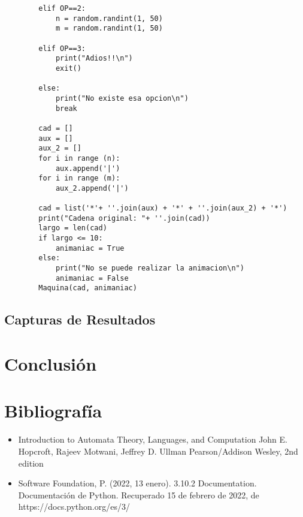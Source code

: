 \documentclass{article}
\begin{document}
\begin{lstlisting}
        elif OP==2:
            n = random.randint(1, 50)
            m = random.randint(1, 50)   
        
        elif OP==3:
            print("Adios!!\n")
            exit()
        
        else:
            print("No existe esa opcion\n")
            break
        
        cad = []
        aux = []
        aux_2 = []
        for i in range (n):
            aux.append('|')
        for i in range (m):
            aux_2.append('|')
             
        cad = list('*'+ ''.join(aux) + '*' + ''.join(aux_2) + '*')
        print("Cadena original: "+ ''.join(cad))
        largo = len(cad)
        if largo <= 10:
            animaniac = True
        else:
            print("No se puede realizar la animacion\n")
            animaniac = False
        Maquina(cad, animaniac)
\end{lstlisting}
\subsection{Capturas de Resultados}
\section{Conclusi\'on}
\section{Bibliograf\'ia}
\begin{itemize}
    \item Introduction to Automata Theory, Languages, and Computation
    John E. Hopcroft, Rajeev Motwani, Jeffrey D. Ullman
    Pearson/Addison Wesley, 2nd edition
    \item Software Foundation, P. (2022, 13 enero). 3.10.2 Documentation. Documentación de Python. Recuperado 15 de febrero de 2022, de https://docs.python.org/es/3/
\end{itemize}
\end{document}
